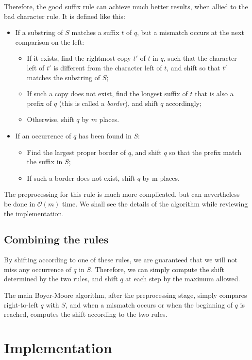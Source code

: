 \documentclass[a4paper,11pt,openany,extrafontsizes,twoside,article]{memoir}
\begin{document}
Therefore, the good suffix rule can achieve much better results, when
allied to the bad character rule. It is defined like this:
\begin{itemize}
\item If a substring of $S$ matches a suffix $t$ of $q$, but a mismatch
  occurs at the next comparison on the left:
  \begin{itemize}
  \item If it exists, find the rightmost copy $t'$ of $t$ in $q$, such
    that the character left of $t'$ is different from the character
    left of $t$, and shift so that $t'$ matches the substring of $S$;
  \item If such a copy does not exist, find the longest suffix of $t$
    that is also a prefix of $q$ (this is called a \emph{border}), and
    shift $q$ accordingly;
  \item Otherwise, shift $q$ by $m$ places.
  \end{itemize}
\item If an occurrence of $q$ has been found in $S$:
  \begin{itemize}
  \item Find the largest proper border of $q$, and shift $q$ so that
    the prefix match the suffix in $S$;
  \item If such a border does not exist, shift $q$ by m places.
  \end{itemize}
\end{itemize}

The preprocessing for this rule is much more complicated, but can
nevertheless be done in $\mathcal{O}(m)$ time. We shall see the details of the
algorithm while reviewing the implementation.

\subsection{Combining the rules}
\label{sec:combining-rules}

By shifting according to one of these rules, we are guaranteed that we
will not miss any occurrence of $q$ in $S$. Therefore, we can simply
compute the shift determined by the two rules, and shift $q$ at each
step by the maximum allowed.

The main Boyer-Moore algorithm, after the preprocessing stage, simply
compares right-to-left $q$ with $S$, and when a mismatch occurs or
when the beginning of $q$ is reached, computes the shift according to
the two rules.

\section{Implementation}
\label{sec:implementation-1}
\end{document}
